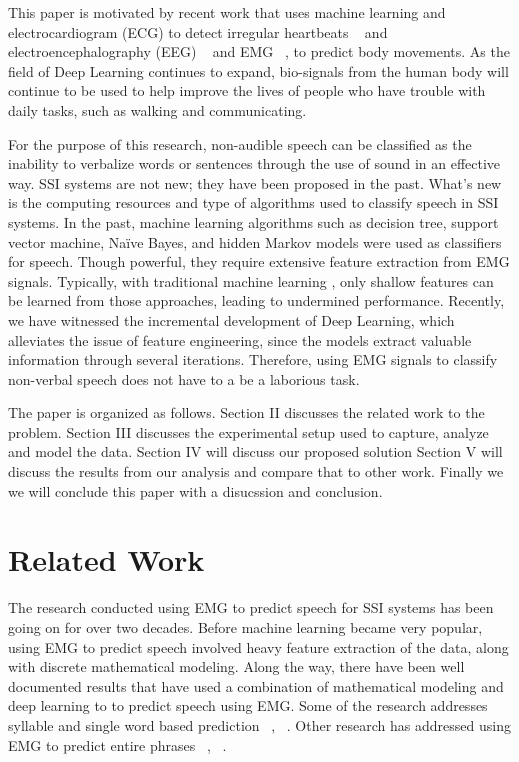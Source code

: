\documentclass[conference]{IEEEtran}
\begin{document}
This paper is motivated by recent work that uses machine learning and  electrocardiogram (ECG) to detect irregular heartbeats 						
~\cite{noauthor_classify_nodate} and electroencephalography (EEG) ~\cite{eltvik_deep_nodate}
and EMG ~\cite{altamirano_emg_nodate}, to predict body movements. As the field of Deep Learning continues to expand, bio-signals from the human body
will continue to be used to help improve the lives of people who have trouble with daily tasks, such as walking and communicating.

For the purpose of this research, non-audible speech can be classified as the inability to verbalize words or sentences through the use of sound in an effective way. SSI systems are not new; they have been proposed in the past. What’s new is the computing resources and type of algorithms used to classify speech in SSI systems. In the past, machine learning algorithms such as decision tree, support vector machine, Naïve Bayes, and hidden Markov models were used as classifiers for speech. Though powerful, they require extensive feature extraction from EMG signals. Typically, with traditional machine learning , only shallow features can be learned from those approaches, leading to undermined performance. Recently, we have witnessed the incremental development of Deep Learning, which alleviates the issue of feature engineering,
since the models extract valuable information through several iterations. Therefore, using EMG signals to classify non-verbal speech does not have to a be a laborious task.

The paper is organized as follows. Section II discusses the related work to the problem.
Section III discusses the experimental setup used to capture, analyze and model the data.
Section IV will discuss our proposed solution
Section V will discuss the results from our analysis and compare that to other work. Finally we we will conclude this paper with a disucssion and conclusion.

\section{Related Work}
The research conducted using EMG to predict speech for SSI systems has been going on for over two decades. Before machine learning became very popular, using
EMG to predict speech involved heavy feature extraction of the data, along with
discrete mathematical modeling. Along the way, there have been well documented results that have used a combination of mathematical modeling and deep learning to to predict speech using EMG. Some of the research addresses syllable and single word based prediction
~\cite{lopez-larraz_syllable-based_2010}, ~\cite{maier-hein_session_2005}. Other research
has addressed using EMG to predict entire phrases ~\cite{janke_emg--speech:_2017},
~\cite{kapur_alterego:_2018}.
\end{document}
